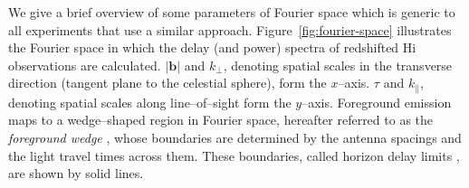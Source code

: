 \documentclass[preprint2,iop,numberedappendix,twocolappendix,appendixfloats]{emulateapj}
\begin{document}
We give a brief overview of some parameters of Fourier space which is generic to all experiments that use a similar approach. Figure~\ref{fig:fourier-space} illustrates the Fourier space in which the delay (and power) spectra of redshifted H{\sc i} observations are calculated. $|\boldsymbol{b}|$ and $k_\perp$, denoting spatial scales in the transverse direction (tangent plane to the celestial sphere), form the $x$--axis. $\tau$ and $k_\parallel$, denoting spatial scales along line--of--sight form the $y$--axis. Foreground emission maps to a wedge--shaped region in Fourier space, hereafter referred to as the {\it foreground wedge} \citep{dat10}, whose boundaries are determined by the antenna spacings and the light travel times across them. These boundaries, called horizon delay limits \citep{ved12,par12b}, are shown by solid lines. 
\end{document}
